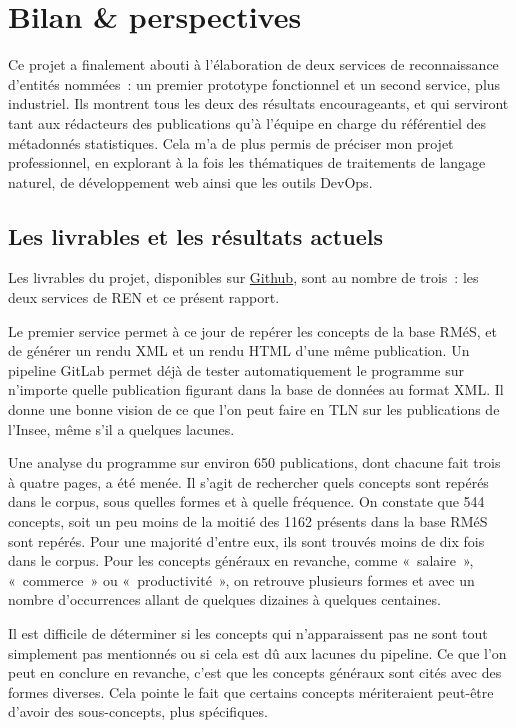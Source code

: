 \section{Bilan \& perspectives}
Ce projet a finalement abouti à l'élaboration de deux services de reconnaissance d'entités nommées~: un premier prototype fonctionnel et un second service, plus industriel. Ils montrent tous les deux des résultats encourageants, et qui serviront tant aux rédacteurs des publications qu'à l'équipe en charge du référentiel des métadonnés statistiques. Cela m'a de plus permis de préciser mon projet professionnel, en explorant à la fois les thématiques de traitements de langage naturel, de développement web ainsi que les outils DevOps.

\subsection{Les livrables et les résultats actuels}
Les livrables du projet, disponibles sur \href{https://github.com/Mardelor?tab=repositories}{Github}, sont au nombre de trois~: les deux services de REN et ce présent rapport.
\newline

Le premier service permet à ce jour de repérer les concepts de la base RMéS, et de générer un rendu XML et un rendu HTML d'une même publication. Un pipeline GitLab permet déjà de tester automatiquement le programme sur n'importe quelle publication figurant dans la base de données au format XML. Il donne une bonne vision de ce que l'on peut faire en TLN sur les publications de l'Insee, même s'il a quelques lacunes.
\newline

Une analyse du programme sur environ 650 publications, dont chacune fait trois à quatre pages, a été menée. Il s'agit de rechercher quels concepts sont repérés dans le corpus, sous quelles formes et à quelle fréquence. On constate que 544 concepts, soit un peu moins de la moitié des 1162 présents dans la base RMéS sont repérés. Pour une majorité d'entre eux, ils sont trouvés moins de dix fois dans le corpus. Pour les concepts généraux en revanche, comme «~salaire~», «~commerce~» ou «~productivité~», on retrouve plusieurs formes et avec un nombre d'occurrences allant de quelques dizaines à quelques centaines.

Il est difficile de déterminer si les concepts qui n'apparaissent pas ne sont tout simplement pas mentionnés ou si cela est dû aux lacunes du pipeline. Ce que l'on peut en conclure en revanche, c'est que les concepts généraux sont cités avec des formes diverses. Cela pointe le fait que certains concepts mériteraient peut-être d'avoir des sous-concepts, plus spécifiques.
\newline


